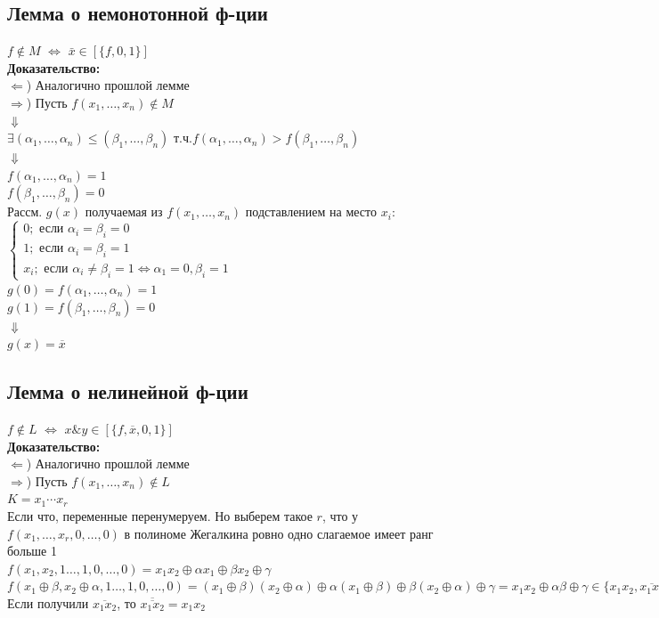 \documentclass[12pt]{article}
\begin{document}
\subsection{Лемма о немонотонной ф-ции}
	$f \notin M$ $\Leftrightarrow$ $\bar{x} \in [\{f, 0,1\}]$\\
	\textbf{Доказательство:}\\
		$\Leftarrow$) Аналогично прошлой лемме\\
		$\Rightarrow$)
		Пусть $f(x_1,\dotsc,x_n) \notin M$\\
		$\Downarrow$\\
		$\exists (\alpha_1,\dotsc,\alpha_n) \leqslant (\beta_1,\dotsc,\beta_n)$ т.ч.$f(\alpha_1,\dotsc,\alpha_n) > f(\beta_1,\dotsc,\beta_n)$\\
		$\Downarrow$\\
		$f(\alpha_1,\dotsc,\alpha_n) = 1$\\
		$f(\beta_1,\dotsc,\beta_n) = 0$\\
		Рассм. $g(x)$ получаемая из $f(x_1,\dotsc,x_n)$ подставлением на место $x_i$:
		$\begin{cases}
			0; \text{ если } \alpha_i = \beta_i = 0\\
			1; \text{ если } \alpha_i = \beta_i = 1\\
			x_i; \text{ если } \alpha_i \neq \beta_i = 1 \Leftrightarrow \alpha_1=0, \beta_i=1
		\end{cases}$\\
		$g(0) = f(\alpha_1,\dotsc,\alpha_n) = 1$\\
		$g(1) = f(\beta_1,\dotsc,\beta_n) = 0$\\
		$\Downarrow$\\
		$g(x) = \overline{x}$\\
	\qedsymbol
\subsection{Лемма о нелинейной ф-ции}
	$f \notin L$ $\Leftrightarrow$ $x \& y \in [\{f, \overline{x},0, 1\}]$\\
	\textbf{Доказательство:}\\
		$\Leftarrow$) Аналогично прошлой лемме\\
		$\Rightarrow$)
		Пусть $f(x_1,\dotsc,x_n) \notin L$\\
		$K = x_1\dotsm x_r$\\
		Если что, переменные перенумеруем. Но выберем такое $r$, что
		у $f(x_1,\dotsc,x_r,0,\dotsc,0)$ в полиноме Жегалкина ровно одно слагаемое имеет ранг больше 1\\
		$f(x_1,x_2,1\dotsc,1,0,\dotsc,0) = x_1x_2 \oplus \alpha x_1 \oplus \beta x_2 \oplus \gamma$\\
		$f(x_1 \oplus \beta,x_2 \oplus \alpha,1\dotsc,1,0,\dotsc,0) = (x_1 \oplus \beta)(x_2 \oplus \alpha) \oplus \alpha (x_1 \oplus \beta) \oplus \beta (x_2 \oplus \alpha) \oplus \gamma = x_1x_2 \oplus \alpha \beta \oplus \gamma \in \{x_1x_2, \overline{x_1x_2}\}$\\
		Если получили $\overline{x_1x_2}$, то $\overline{\overline{x_1x_2}} = x_1x_2$\\
	\qedsymbol
\end{document}

